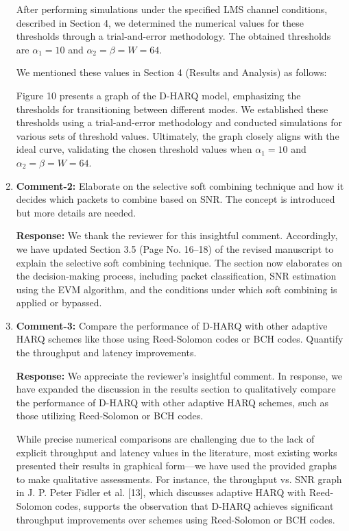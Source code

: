 \documentclass[a4paper,10pt]{article}
\begin{document}
\begin{enumerate}
After performing simulations under the specified LMS channel conditions, described in Section 4, we determined the numerical values for these thresholds through a trial-and-error methodology. The obtained thresholds are \( \alpha_1 = 10 \) and \( \alpha_2 = \beta = W = 64 \).  

We mentioned these values in Section 4 (Results and Analysis) as follows:  

Figure 10 presents a graph of the D-HARQ model, emphasizing the thresholds for transitioning between different modes. We established these thresholds using a trial-and-error methodology and conducted simulations for various sets of threshold values. Ultimately, the graph closely aligns with the ideal curve, validating the chosen threshold values when \( \alpha_1 = 10 \) and \( \alpha_2 = \beta = W = 64 \).

\item {\color{blue} \textbf{Comment-2:} Elaborate on the selective soft combining technique and how it decides which packets to combine based on SNR. The concept is introduced but more details are needed.}

\textbf{Response:}  We thank the reviewer for this insightful comment. Accordingly, we have updated Section 3.5 (Page No. 16–18) of the revised manuscript to explain the selective soft combining technique. The section now elaborates on the decision-making process, including packet classification, SNR estimation using the EVM algorithm, and the conditions under which soft combining is applied or bypassed.  

\item {\color{blue} \textbf{Comment-3:} Compare the performance of D-HARQ with other adaptive HARQ schemes like those using Reed-Solomon codes or BCH codes. Quantify the throughput and latency improvements.}

\textbf{Response:} We appreciate the reviewer’s insightful comment. In response, we have expanded the discussion in the results section to qualitatively compare the performance of D-HARQ with other adaptive HARQ schemes, such as those utilizing Reed-Solomon or BCH codes.

While precise numerical comparisons are challenging due to the lack of explicit throughput and latency values in the literature, most existing works presented their results in graphical form—we have used the provided graphs to make qualitative assessments. For instance, the throughput vs. SNR graph in J. P. Peter Fidler et al. [13], which discusses adaptive HARQ with Reed-Solomon codes, supports the observation that D-HARQ achieves significant throughput improvements over schemes using Reed-Solomon or BCH codes.


\end{enumerate}
\end{document}
